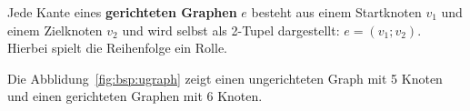 \begin{mdef}
Jede Kante eines \textbf{gerichteten Graphen} $e$ besteht aus einem Startknoten $v_1$ und einem Zielknoten $v_2$ und wird selbst als 2-Tupel dargestellt: $e= (v_1;v_2)$. 
Hierbei spielt die Reihenfolge ein Rolle.
\end{mdef}


\begin{mbsp}
Die Abblidung~\ref{fig:bsp:ugraph} zeigt einen ungerichteten Graph mit 5 Knoten und einen gerichteten Graphen mit 6 Knoten. 
\end{mbsp}

